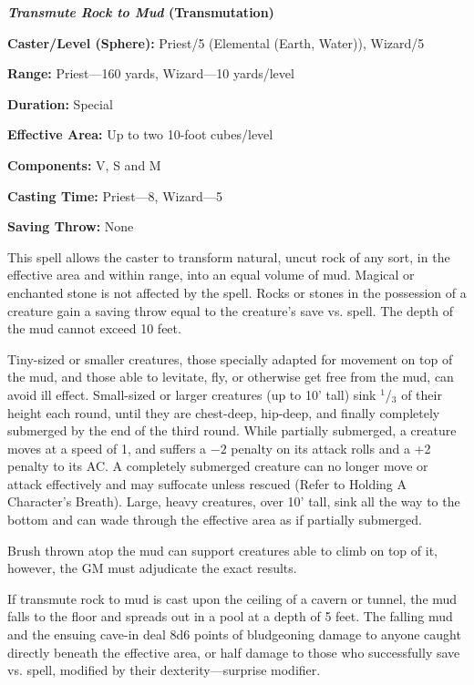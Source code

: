 \begin{multicols}{2}
\noindent
\begin{minipage}{\columnwidth}

\noindent \textbf{\textit{Transmute Rock to Mud} (Transmutation)}

\noindent \textbf{Caster/Level (Sphere):} Priest/5 (Elemental (Earth, Water)), Wizard/5

\noindent \textbf{Range:} Priest---160 yards, Wizard---10 yards/level

\noindent \textbf{Duration:} Special

\noindent \textbf{Effective Area:} Up to two 10-foot cubes/level

\noindent \textbf{Components:} V, S and M

\noindent \textbf{Casting Time:} Priest---8, Wizard---5

\noindent \textbf{Saving Throw:} None

\end{minipage}

This spell allows the caster to transform natural, uncut rock of any sort, in the effective area and within range, into an equal volume of mud.  Magical or enchanted stone is not affected by the spell.  Rocks or stones in the possession of a creature gain a saving throw equal to the creature's save vs. spell.  The depth of the mud cannot exceed 10 feet.  

Tiny-sized or smaller creatures, those specially adapted for movement on top of the mud, and those able to levitate, fly, or otherwise get free from the mud, can avoid ill effect.  Small-sized or larger creatures (up to 10' tall) sink $^1$/$_3$ of their height each round, until they are chest-deep, hip-deep, and finally completely submerged by the end of the third round.  While partially submerged, a creature moves at a speed of 1, and suffers a $-2$ penalty on its attack rolls and a +2 penalty to its AC.  A completely submerged creature can no longer move or attack effectively and may suffocate unless rescued (Refer to Holding A Character's Breath).  Large, heavy creatures, over 10' tall, sink all the way to the bottom and can wade through the effective area as if partially submerged.

Brush thrown atop the mud can support creatures able to climb on top of it, however, the GM must adjudicate the exact results.
 
If transmute rock to mud is cast upon the ceiling of a cavern or tunnel, the mud falls to the floor and spreads out in a pool at a depth of 5 feet. The falling mud and the ensuing cave-in deal 8d6 points of bludgeoning damage to anyone caught directly beneath the effective area, or half damage to those who successfully save vs. spell, modified by their dexterity---surprise modifier. 


\end{multicols}
